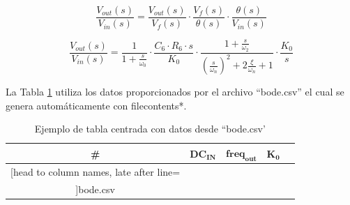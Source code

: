 \documentclass{article}
\begin{document}
\begin{equation} \label{voutvin_eqn}
\frac{V_{out}(s)}{V_{in}(s)} = \frac{V_{out}(s)}{V_f(s)} \cdot \frac{V_f(s)}{\theta(s)}\cdot \frac{\theta(s)}{V_{in}(s)}
\end{equation}

\begin{equation} \label{voutvin_eqn_posta}
\frac{V_{out}(s)}{V_{in}(s)} = \frac{1}{ 1 + \frac{s}{\omega_0}} \cdot \frac{C_6 \cdot R_6 \cdot s}{K_0}
\cdot \frac{ 1 + \frac{s}{\omega_2} }
{ \left(\frac{s}{\omega_n}\right)^2 + 2\frac{\xi}{\omega_n}  + 1} \cdot \frac{K_0}{s}
\end{equation}

La Tabla \ref{table7} utiliza los datos proporcionados por el archivo ``bode.csv'' el cual se genera automáticamente con filecontents*.
\begin{table}[h!]
	\centering
	\caption{Ejemplo de tabla centrada con datos desde ``bode.csv'}
	\label{table7}
	\begin{tabular}{c c c c c}%
		\bfseries \# & $\bm{DC_{IN}}$ & $\bm{freq_{out}}$ & $\bm{K_0}$  \\ \hline
		\csvreader[head to column names, late after line=\\]{bode.csv}{}{\thecsvrow & \frec & \vin & \vout & \fase}
		\hline
	\end{tabular}
\end{table}
\end{document}
